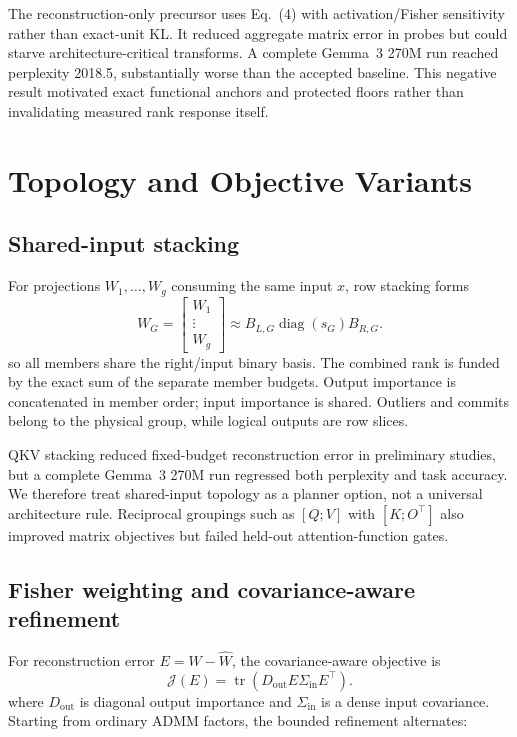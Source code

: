 \documentclass[10pt]{article}
\begin{document}
The reconstruction-only precursor uses Eq.~(4) with
activation/Fisher sensitivity rather than exact-unit KL. It reduced aggregate
matrix error in probes but could starve architecture-critical transforms. A
complete Gemma~3 270M run reached perplexity 2018.5, substantially worse than
the accepted baseline. This negative result motivated exact functional anchors
and protected floors rather than invalidating measured rank response itself.

\section{Topology and Objective Variants}

\subsection{Shared-input stacking}

For projections $W_1,\ldots,W_g$ consuming the same input $x$, row stacking
forms
\[
 W_G=\begin{bmatrix}W_1\\ \vdots\\ W_g\end{bmatrix}
 \approx B_{L,G}\operatorname{diag}(s_G)B_{R,G}.
 \tag{6}
\]
so all members share the right/input binary basis. The combined rank is funded
by the exact sum of the separate member budgets. Output importance is
concatenated in member order; input importance is shared. Outliers and commits
belong to the physical group, while logical outputs are row slices.

QKV stacking reduced fixed-budget reconstruction error in preliminary studies,
but a complete Gemma~3 270M run regressed both perplexity and task accuracy.
We therefore treat shared-input topology as a planner option, not a universal
architecture rule. Reciprocal groupings such as $[Q;V]$ with $[K;O^\top]$
also improved matrix objectives but failed held-out attention-function gates.

\subsection{Fisher weighting and covariance-aware refinement}

For reconstruction error $E=W-\widehat W$, the covariance-aware objective is
\[
 \mathcal J(E)=
 \operatorname{tr}\!\left(D_{\mathrm{out}}E\Sigma_{\mathrm{in}}E^\top\right).
 \tag{7}
\]
where $D_{\mathrm{out}}$ is diagonal output importance and
$\Sigma_{\mathrm{in}}$ is a dense input covariance. Starting from ordinary
ADMM factors, the bounded refinement alternates:
\end{document}
